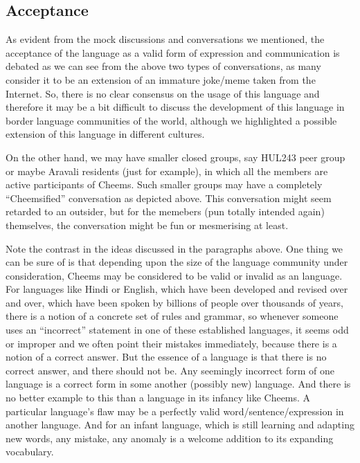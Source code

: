 \def\DevnagVersion{2.17}\documentclass{article}
\begin{document}
\subsection{Acceptance}
As evident from the mock discussions and conversations we mentioned, the acceptance of the language as a valid form of expression and communication is debated as we can see from the above two types of conversations, as many consider it to be an extension of an immature joke/meme taken from the Internet. So, there is no clear consensus on the usage of this language and therefore it may be a bit difficult to discuss the development of this language in border language communities of the world, although we highlighted a possible extension of this language in different cultures.\par
On the other hand, we may have smaller closed groups, say HUL243 peer group or maybe Aravali residents (just for example), in which all the members are active participants of Cheems. Such smaller groups may have a completely ``Cheemsified'' conversation as depicted above. This conversation might seem retarded to an outsider, but for the memebers (pun totally intended again) themselves, the conversation might be fun or mesmerising at least. \par
Note the contrast in the ideas discussed in the paragraphs above. One thing we can be sure of is that depending upon the size of the language community under consideration, Cheems may be considered to be valid or invalid as an language. For languages like Hindi or English, which have been developed and revised over and over, which have been spoken by billions of people over thousands of years, there is a notion of a concrete set of rules and grammar, so whenever someone uses an ``incorrect'' statement in one of these established languages, it seems odd or improper and we often point their mistakes immediately, because there is a notion of a correct answer. But the essence of a language is that there is no correct answer, and there should not be. Any seemingly incorrect form of one language is a correct form in some another (possibly new) language. And there is no better example to this than a language in its infancy like Cheems. A particular language's flaw may be a perfectly valid word/sentence/expression in another language. And for an infant language, which is still learning and adapting new words, any mistake, any anomaly is a welcome addition to its expanding vocabulary. \par
\end{document}
